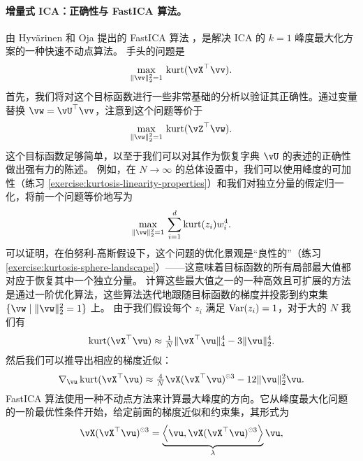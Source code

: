 \documentclass[../../book-main.tex]{subfiles}
\begin{document}
\paragraph{增量式 ICA：正确性与 FastICA 算法。}
由 Hyvärinen 和 Oja 提出的 FastICA 算法 \cite{hyvarinen-1997}，是解决 ICA 的 $k=1$ 峰度最大化方案的一种快速不动点算法。
手头的问题是
\begin{equation}\label{eq:kurtosis-maximization-sphere-finitesample}
    \max_{\norm{\vv}_2^2 = 1}\, \kurt(\vX^\top \vv).
\end{equation}
首先，我们将对这个目标函数进行一些非常基础的分析以验证其正确性。通过变量替换 $\vw = \vU^\top \vv$，注意到这个问题等价于
\begin{equation*}
    \max_{\norm{\vw}_2^2 = 1}\, 
    \mathrm{kurt}(\vZ^\top \vw).
\end{equation*}
这个目标函数足够简单，以至于我们可以对其作为恢复字典 $\vU$ 的表述的正确性做出强有力的陈述。
例如，在 $N \to \infty$ 的总体设置中，我们可以使用峰度的可加性（练习 \ref{exercise:kurtosis-linearity-properties}）和我们对独立分量的假定归一化，将前一个问题等价地写为
\begin{equation}\label{eq:kurtosis-maximization-sphere-population-simple}
    \max_{\norm{\vw}_2^2 = 1}\, 
    \sum_{i=1}^d \mathrm{kurt}(z_i) w_i^4.
\end{equation}
可以证明，在伯努利-高斯假设下，这个问题的优化景观是“良性的”（练习 \ref{exercise:kurtosis-sphere-landscape}）——这意味着目标函数的所有局部最大值都对应于恢复其中一个独立分量。
计算这些最大值之一的一种高效且可扩展的方法是通过一阶优化算法，这些算法迭代地跟随目标函数的梯度并投影到约束集 $\set{\vw \given \norm{\vw}_2^2 = 1}$ 上。
由于我们假设每个 $z_i$ 满足 $\operatorname{Var}(z_i)=1$，对于大的 $N$ 我们有
\begin{equation}\label{eq:kurtosis-approximation-l4}
    \kurt(\vX^\top \vu)
    \approx
    \tfrac{1}{N} \norm{\vX^\top \vu}_4^4 - 3 \norm{\vu}_2^4.
\end{equation}
然后我们可以推导出相应的梯度近似：
\begin{equation*}
    \nabla_{\vu} \kurt(\vX^\top \vu)
    \approx
    \tfrac{4}{N} \vX (\vX^\top \vu)^{\hada 3}
    - 12 \norm{\vu}_2^2 \vu.
\end{equation*}
FastICA 算法使用一种不动点方法来计算最大峰度的方向。它从峰度最大化问题的一阶最优性条件开始，给定前面的梯度近似和约束集，其形式为
\begin{align}\label{eq:kurtosis-max-sphere-stationarity}
   \vX (\vX^\top \vu)^{\hada 3} 
   = 
   \underbrace{
   \ip*{\vu}{
   \vX (\vX^\top \vu)^{\hada 3} 
   }}_{\lambda} \vu,
\end{align}
\end{document}
